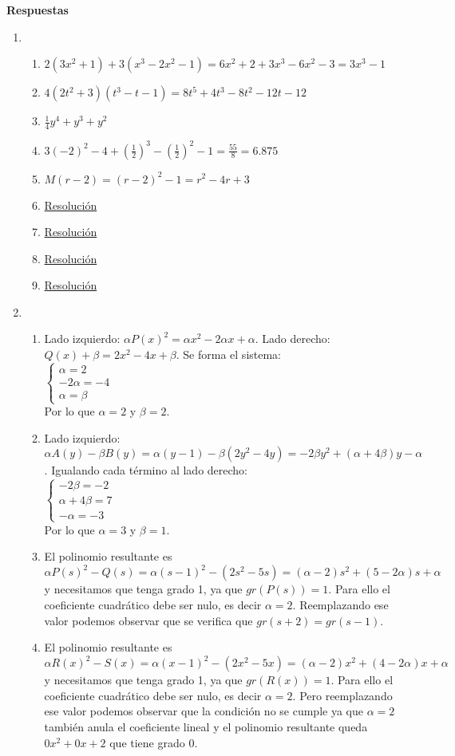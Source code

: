\documentclass[a4paper]{article}
\newcommand{\exercise}{\item}
\newcommand{\SEL}[1]{\left\{\begin{matrix} #1 \end{matrix}\right.}
\newcommand{\df}[2]{\displaystyle\frac{#1}{#2}}
\begin{document}
 \textbf{Respuestas}\begin{enumerate}\exercise\begin{enumerate} [label=(\alph*)]		\item $2(3x^2+1)+3(x^3-2x^2-1)=6x^2+2+3x^3-6x^2-3=3x^3-1$
		\item $4(2t^2+3)(t^3-t-1)=8t^5+4t^3-8t^2-12t-12$ 
		\item $\df{1}{4}y^4+y^3+y^2$
		\item $3(-2)^2-4+\left(\df{1}{2}\right)^3-\left(\df{1}{2}\right)^2-1=\df{55}{8} = 6.875$
		\item $M(r-2)=(r-2)^2-1=r^2-4r+3$
		\item \href{https://youtu.be/DWDi7BKAKbc}{Resolución}
		\item \href{https://youtu.be/bfCWsvZfFq0}{Resolución}
		\item \href{https://youtu.be/W3HcTD4IC94}{Resolución}
		\item \href{https://youtu.be/0Dw3MAwrA34}{Resolución}
\end{enumerate}\exercise\begin{enumerate} [label=(\alph*)]		\item Lado izquierdo: $\alpha P(x)^2= \alpha x^2-2 \alpha x+ \alpha$. Lado derecho: $Q(x) +\beta= 2x^2-4x+\beta$. Se forma el sistema: \\ $\SEL{\alpha=2 \\ -2\alpha = -4 \\ \alpha= \beta}$ \\ Por lo que $\alpha=2$ y $\beta=2$.
		\item Lado izquierdo: $\alpha A(y)-\beta B(y) = \alpha (y-1)- \beta (2y^2-4y)= -2\beta y^2 + (\alpha+4\beta) y - \alpha$. Igualando cada término al lado derecho: \\  $\SEL{-2\beta =-2 \\ \alpha+4\beta=7 \\ -\alpha=-3}$ \\ Por lo que $\alpha=3$ y $\beta=1$.
		\item El polinomio resultante es $\alpha P(s)^2 - Q(s)= \alpha (s-1)^2 - (2s^2-5s)= (\alpha-2) s^2 + (5-2\alpha) s + \alpha$ y necesitamos que tenga grado 1, ya que $gr\left(P(s)\right)=1$. Para ello el coeficiente cuadrático debe ser nulo, es decir $\alpha=2$. Reemplazando ese valor podemos observar que se verifica que $gr(s+2)=gr(s-1)$.
		\item El polinomio resultante es $\alpha R(x)^2 - S(x)= \alpha (x-1)^2 - (2x^2-5x)= (\alpha-2) x^2 + (4-2\alpha) x + \alpha$ y necesitamos que tenga grado 1, ya que $gr\left(R(x)\right)=1$. Para ello el coeficiente cuadrático debe ser nulo, es decir $\alpha=2$. Pero reemplazando ese valor podemos observar que la condición no se cumple ya que $\alpha=2$ también anula el coeficiente lineal y el polinomio resultante queda $0x^2+0x+2$ que tiene grado $0$.

\end{enumerate}
\end{enumerate}
\end{document}
